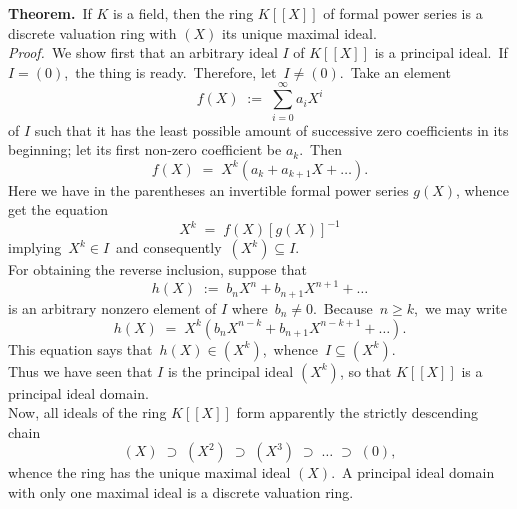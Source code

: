 \documentclass[12pt]{article}
\theoremstyle{definition}
\begin{document}
\textbf{Theorem.}\, If $K$ is a field, then the ring $K[[X]]$ of formal power series is a discrete valuation ring with 
$(X)$ its unique maximal ideal.\\

\emph{Proof.}\, We show first that an arbitrary ideal $I$ of $K[[X]]$ is a principal ideal.\, If\, 
$I = (0)$,\, the thing is ready.\, Therefore, let\, $I \neq (0)$.\, Take an element 
$$f(X) \;:=\; \sum_{i=0}^\infty a_iX^i$$
of $I$ such that it has the least possible amount of successive zero coefficients in its beginning; let its first non-zero coefficient be $a_k$.\, Then
$$f(X) \;=\; X^k(a_k\!+\!a_{k+1}X\!+\ldots).$$
Here we have in the parentheses an invertible formal power series $g(X)$, whence get the equation
$$X^k \;=\; f(X)[g(X)]^{-1}$$
implying\, $X^k \in I$\, and consequently\, $(X^k) \subseteq I$.\\
For obtaining the reverse inclusion, suppose that
$$h(X) \;:=\; b_nX^n\!+\!b_{n+1}X^{n+1}\!+\ldots$$
is an arbitrary nonzero element of $I$ where\, $b_n \neq 0$.\, Because\, $n \ge k$,\, we may write
$$h(X) \;=\; X^k(b_nX^{n-k}\!+\!b_{n+1}X^{n-k+1}\!+\ldots).$$
This equation says that\, $h(X) \in (X^k)$,\, whence\, $I \subseteq (X^k)$.\\
Thus we have seen that $I$ is the principal ideal $(X^k)$, so that $K[[X]]$ is a principal ideal domain.\\
Now, all ideals of the ring $K[[X]]$ form apparently the strictly descending chain
$$(X) \;\supset\; (X^2) \;\supset\; (X^3) \;\supset\; \ldots \;\supset\; (0),$$
whence the ring has the unique maximal ideal $(X)$.\, A principal ideal domain with only one maximal ideal is a discrete valuation ring.





\end{document}
